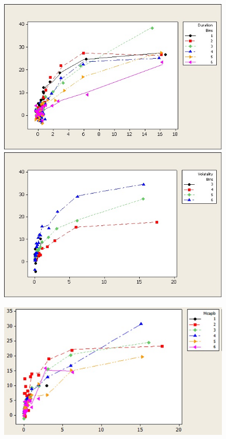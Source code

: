     \begin{figure}[!ht]
        \begin{minipage}[b]{0.45\linewidth}
            \centering
            \includegraphics[width=\textwidth]{chapters/chapter_exec_models/figures/fig4.jpg}
            \includegraphics[width=\textwidth]{chapters/chapter_exec_models/figures/fig5.jpg}
        \end{minipage}
        \hspace{0.5cm}
        \begin{minipage}[b]{0.45\linewidth}
            \centering
            \includegraphics[width=1.05\textwidth]{chapters/chapter_exec_models/figures/fig6.jpg}

\end{minipage}
\end{figure}

